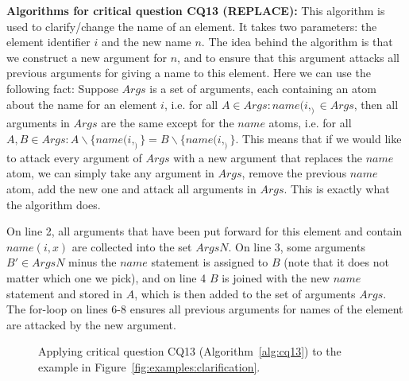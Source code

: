 \noindent\textbf{Algorithms for critical question CQ13 (REPLACE):}  This algorithm is used to clarify/change the name of an element. It takes two parameters: the element identifier $i$ and the new name $n$. The idea behind the algorithm is that we construct a new argument for $n$, and to ensure that this argument attacks all previous arguments for giving a name to this element. Here we can use the following fact: Suppose $Args$ is a set of arguments, each containing an atom about the name for an element $i$, i.e. for all $A\in Args: name(i,_)\in Args$, then all arguments in $Args$ are the same except for the $name$ atoms, i.e. for all $A,B\in Args: A\backslash\{name(i,_)\} = B\backslash\{name(i,_)\}$. This means that if we would like to attack every argument of $Args$ with a new argument that replaces the $name$ atom, we can simply take any argument in $Args$, remove the previous $name$ atom, add the new one and attack all arguments in $Args$. This is exactly what the algorithm does.


On line 2, all arguments that have been put forward for this element and contain $name(i,x)$ are collected into the set $ArgsN$. On line 3, some arguments $B'\in ArgsN$ minus the $name$ statement is assigned to $B$ (note that it does not matter which one we pick), and on line 4 $B$ is joined with the new $name$ statement and stored in $A$, which is then added to the set of arguments $Args$. The for-loop on lines 6-8 ensures all previous arguments for names of the element are attacked by the new argument.

\begin{figure}[ht!]
\centering
\caption{Applying critical question CQ13 (Algorithm~\ref{alg:cq13}) to the example in Figure~\ref{fig:examples:clarification}.}
\label{fig:examples:clarification:formal}
\end{figure} 

